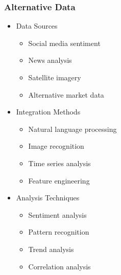 \documentclass[conference]{IEEEtran}
\begin{document}
\subsubsection{Alternative Data}
\begin{itemize}
    \item Data Sources
    \begin{itemize}
        \item Social media sentiment
        \item News analysis
        \item Satellite imagery
        \item Alternative market data
    \end{itemize}
    
    \item Integration Methods
    \begin{itemize}
        \item Natural language processing
        \item Image recognition
        \item Time series analysis
        \item Feature engineering
    \end{itemize}
    
    \item Analysis Techniques
    \begin{itemize}
        \item Sentiment analysis
        \item Pattern recognition
        \item Trend analysis
        \item Correlation analysis
    \end{itemize}
\end{itemize}
\end{document}
